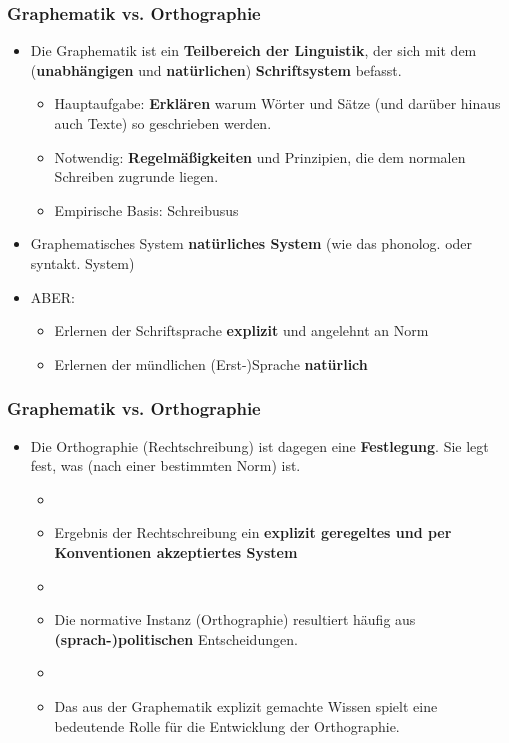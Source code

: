 \begin{frame}
\frametitle{Graphematik vs. Orthographie}

	\begin{itemize}
		\item Die Graphematik ist ein \textbf{Teilbereich der Linguistik}, der sich mit dem (\textbf{unabhängigen} und \textbf{natürlichen}) \textbf{Schriftsystem} befasst.
		
		\begin{itemize}
			\item Hauptaufgabe: \textbf{Erklären} \ras warum Wörter und Sätze (und darüber hinaus auch Texte) so geschrieben werden.
			\item Notwendig: \textbf{Regelmäßigkeiten} und Prinzipien, die dem normalen Schreiben zugrunde liegen.
			\item Empirische Basis: Schreibusus
		\end{itemize}
			
		\item Graphematisches System \ras \textbf{natürliches System} (wie das phonolog. oder syntakt. System)
		\item ABER:
		
		\begin{itemize}
			\item Erlernen der Schriftsprache \ras \textbf{explizit} und angelehnt an Norm
			\item Erlernen der mündlichen (Erst-)Sprache \ras \textbf{natürlich}	
		\end{itemize}
	\end{itemize}

\end{frame}



\begin{frame}
\frametitle{Graphematik vs. Orthographie}

\begin{itemize}
	\item Die Orthographie (Rechtschreibung) ist dagegen eine \textbf{ Festlegung}. Sie legt fest, was \textbf{} (nach einer bestimmten Norm) ist.
	
	\begin{itemize}
		\item[]		
		\item Ergebnis der Rechtschreibung \ras ein \textbf{explizit geregeltes und per Konventionen akzeptiertes System}
		\item[]		
		\item Die normative Instanz (Orthographie) resultiert häufig aus \textbf{(sprach-)politischen} Entscheidungen.
		\item[]		
		\item Das aus der Graphematik explizit gemachte Wissen spielt eine bedeutende Rolle für die Entwicklung der Orthographie.
	\end{itemize}
\end{itemize}


\end{frame}


